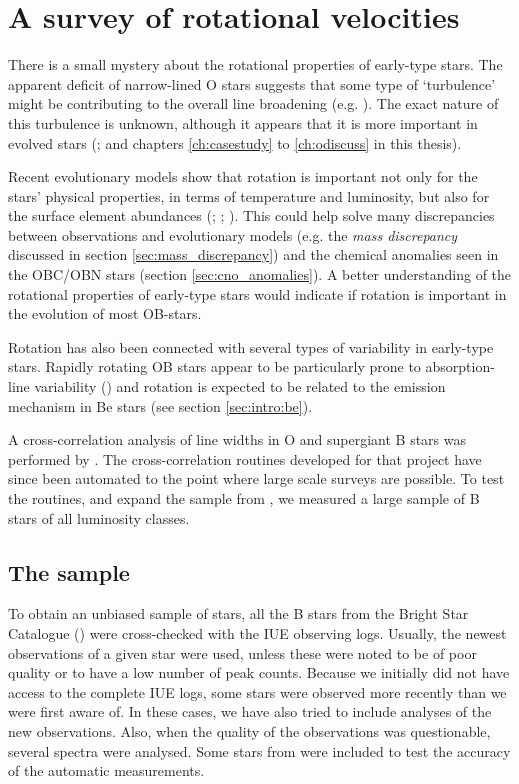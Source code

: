 \chapter{A survey of rotational velocities}
\label{ch:xcorr}

There is a small mystery about the rotational properties of
early-type stars. The apparent deficit of narrow-lined O stars
suggests that some type of `turbulence' might be contributing to the
overall line broadening (e.g. \cite{co:vii}). The exact nature of this
turbulence is unknown, although it appears that it is more important in
evolved stars (\cite{pe:xcorr}; \cite{ho:xcorr} and chapters
\ref{ch:casestudy} to \ref{ch:odiscuss} in this thesis).

Recent evolutionary models show that rotation is important not only
for the stars' physical properties, in terms of temperature and
luminosity, but also for the surface element abundances (\cite{la:98};
\cite{ma:98}; \cite{me:98}). This could help solve many discrepancies
between observations and evolutionary models (e.g. the \emph{mass
discrepancy} discussed in section
\ref{sec:mass_discrepancy}) and the chemical anomalies seen in the
OBC/OBN stars (section \ref{sec:cno_anomalies}). A better
understanding of the rotational properties of early-type stars would
indicate if rotation is important in the evolution of most
OB-stars.

Rotation has also been connected with several types of variability in
early-type stars. Rapidly rotating OB stars appear to be particularly
prone to absorption-line variability (\cite{fu:96}) and rotation is
expected to be related to the emission mechanism in Be stars (see
section \ref{sec:intro:be}).

A cross-correlation analysis of line widths in O and supergiant B
stars was performed by . The cross-correlation
routines developed for that project have since been automated to the
point where large scale surveys are possible. To test the routines,
and expand the sample from
, we measured a large sample of B stars of all
luminosity classes.


\section{The sample}

To obtain an unbiased sample of stars, all the B stars from the Bright
Star Catalogue (\cite{bsc5}) were cross-checked with the IUE observing
logs. Usually, the newest observations of a given star were used,
unless these were noted to be of poor quality or to have a low number
of peak counts. Because we initially did not have access to the
complete IUE logs, some stars were observed more recently than we were
first aware of. In these cases, we have also tried to include analyses of
the new observations. Also, when the quality of the observations was
questionable, several spectra were analysed. Some stars from
 were included to test the accuracy of the automatic
measurements. 

